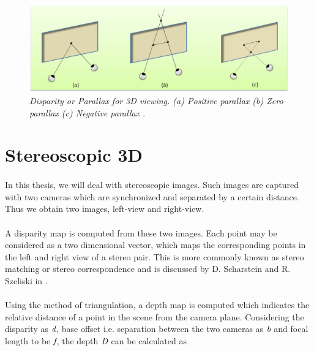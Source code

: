 \begin{figure}[ht]
\centerline{\includegraphics[width=1.0\textwidth]{depth_parallax.png}}
\caption{\textit{Disparity or Parallax for 3D viewing. (a) Positive parallax (b) Zero parallax (c) Negative parallax \cite{bib:production_rules}} \label{fig:depth_parallax}.}
\end{figure}


\section{Stereoscopic 3D}
\paragraph{}
In this thesis, we will deal with stereoscopic images. Such images are captured with two cameras which are synchronized and separated by a certain distance. Thus we obtain two images, left-view and right-view. 

\paragraph{}
A disparity map is computed from these two images. Each point may be considered as a two dimensional vector, which maps the corresponding points in the left and right view of a stereo pair. This is more commonly known as stereo matching or stereo correspondence and is discussed by D. Scharstein and R. Szeliski in \cite{bib:stereo_correspondence}.

\paragraph{}
Using the method of triangulation, a depth map is computed which indicates the relative distance of a point in the scene from the camera plane. Considering the disparity as $\emph{\textit{d}}$, base offset i.e. separation between the two cameras as $\emph{\textit{b}}$ and focal length to be $\emph{\textit{f}}$, the depth $\emph{D}$ can be calculated as

